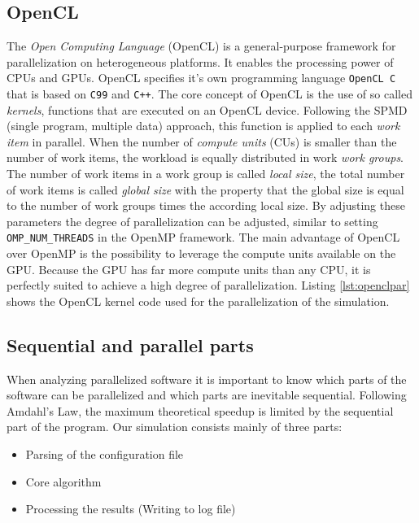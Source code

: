 \documentclass[a4paper,11pt]{scrartcl} %
\begin{document}


\subsection{OpenCL}
The \textit{Open Computing Language} (OpenCL) is a general-purpose framework for parallelization on heterogeneous platforms. It enables the processing power of CPUs and GPUs. OpenCL specifies it's own programming language \texttt{OpenCL C} that is based on \texttt{C99} and \texttt{C++}. The core concept of OpenCL is the use of so called \textit{kernels}, functions that are executed on an OpenCL device. Following the SPMD (single program, multiple data) approach, this function is applied to each \textit{work item} in parallel. When the number of \textit{compute units} (CUs) is smaller than the number of work items, the workload is equally distributed in work \textit{work groups}. The number of work items in a work group is called \textit{local size}, the total number of work items is called \textit{global size} with the property that the global size is equal to the number of work groups times the according local size. By adjusting these parameters the degree of parallelization can be adjusted, similar to setting \texttt{OMP\_NUM\_THREADS} in the OpenMP framework. The main advantage of OpenCL over OpenMP is the possibility to leverage the compute units available on the GPU. Because the GPU has far more compute units than any CPU, it is perfectly suited to achieve a high degree of parallelization. Listing \ref{lst:openclpar} shows the OpenCL kernel code used for the parallelization of the simulation.

\subsection{Sequential and parallel parts}
When analyzing parallelized software it is important to know which parts of the software can be parallelized and which parts are inevitable sequential. Following Amdahl's Law, the maximum theoretical speedup is limited by the sequential part of the program. Our simulation consists mainly of three parts:

\begin{itemize}
  \item Parsing of the configuration file
  \item Core algorithm
  \item Processing the results (Writing to log file)
\end{itemize}
\end{document}
